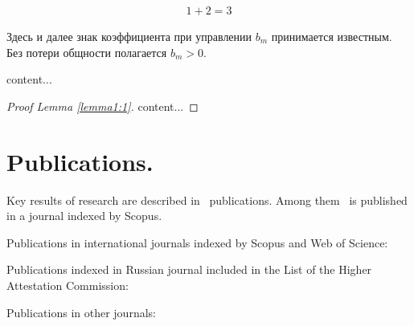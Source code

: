 \begin{align} %
	1+2=3
\end{align}

\begin{assumption-syn-en}
	Здесь и далее знак коэффициента при управлении $b_m$
	принимается известным. Без потери общности полагается $b_m >0$.
\end{assumption-syn-en}
\begin{lemma-syn-en} \label{lemma1:1}
	content...
\end{lemma-syn-en}

\begin{proof}[Proof Lemma \ref{lemma1:1}]
	content...
\end{proof}

\section*{Publications.}

Key results of research are described in \theAllMyPapers~publications. 
Among them
\theScopusPapers~is published in a journal indexed by Scopus. 



Publications in international journals indexed by Scopus and Web of Science:
\printPapperScopus

Publications indexed in Russian journal included in the List of the Higher Attestation Commission: 

Publications in other journals:
\printPapperOther
